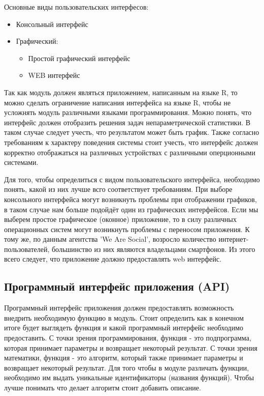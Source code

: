 \documentclass[14pt,a4paper]{scrartcl}
\begin{document}
    Основные виды пользовательских интерфесов:
    \begin{itemize}
        \item Консольный интерфейс
        \item Графический:
        \begin{itemize}
            \item Простой графический интерфейс
            \item WEB интерфейс
        \end{itemize}
    \end{itemize}

    Так как модуль должен являться приложением, написанным на языке R, то можно сделать ограничение написания интерфейса
    на языке R, чтобы не усложнять модуль различными языками программирования.
    Можно понять, что интерфейс должен отобразить решения задач непараметрической статистики.
    В таком случае следует учесть, что результатом может быть график.
    Также согласно требованиям к характеру поведения системы стоит учесть, что интерфейс должен корректно
    отображаться на различных устройствах с различными оперционными системами.

    Для того, чтобы определиться с видом пользовательского интерфейса, необходимо понять, какой из них лучше всго соответствует требованиям.
    При выборе консольного интерфейса могут возникнуть проблемы при отображении графиков, в таком случае нам больше подойдёт один из графических интерфейсов.
    Если мы выберем простое графическое (оконное) приложение, то в силу различных операционных систем могут возникнуть проблемы с переносом приложения.
    К тому же, по данным агентства 'We Are Social', возросло количество интернет-пользователей, большинство из них являются владельцами смартфонов\cite{Internet-statistic-2018}.
    Из этого всего следует, что приложение должно предоставлять web интерфейс.

    \subsection[Программный интерфейс приложения]{Программный интерфейс приложения (API)}
    Программный интерфейс приложения должен предоставлять возможность внедрить необходимую функцию в модуль.
    Стоит определить как в конечном итоге будет выглядеть функция и какой программный интерфейс необходимо предоставить.
    С точки зрения программирования, функция - это подпрограмма, которая принимает параметры и возвращает некоторый результат.
    С точки зрения математики, функция - это алгоритм, который также принимает параметры и возвращает некоторый результат.
    Для того чтобы в модуле различать функции, необходимо им выдать уникальные идентификаторы (названия функций).
    Чтобы лучше понимать что делает алгоритм стоит добавить описание.
\end{document}

